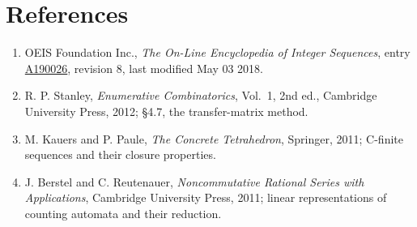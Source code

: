 \documentclass[11pt]{article}
\theoremstyle{definition}
\begin{document}
\section{References}

\begin{enumerate}

\item OEIS Foundation Inc., \emph{The On-Line Encyclopedia of Integer Sequences}, entry \href{https://oeis.org/A190026}{A190026}, revision 8, last modified May 03 2018.

\item R. P. Stanley, \emph{Enumerative Combinatorics}, Vol.~1, 2nd ed., Cambridge University Press, 2012; \S4.7, the transfer-matrix method.

\item M. Kauers and P. Paule, \emph{The Concrete Tetrahedron}, Springer, 2011; C-finite sequences and their closure properties.

\item J. Berstel and C. Reutenauer, \emph{Noncommutative Rational Series with Applications}, Cambridge University Press, 2011; linear representations of counting automata and their reduction.

\end{enumerate}
\end{document}
